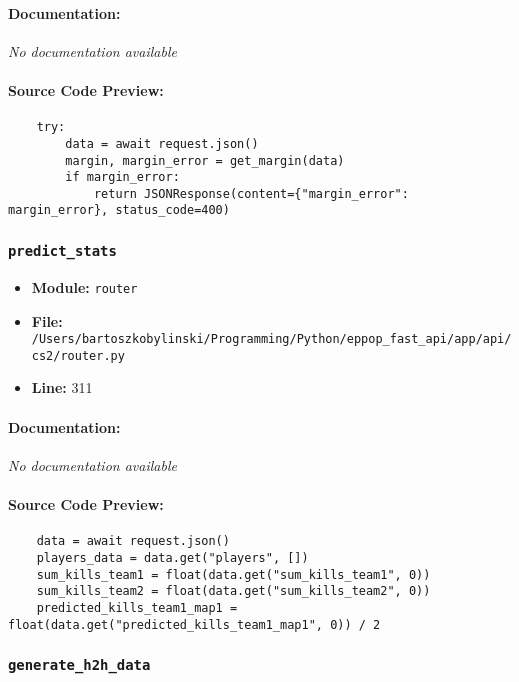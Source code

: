 \documentclass[11pt,a4paper]{article}
\begin{document}
\paragraph{Documentation:} \textit{No documentation available}

\paragraph{Source Code Preview:}
\begin{verbatim}
    try:
        data = await request.json()
        margin, margin_error = get_margin(data)
        if margin_error:
            return JSONResponse(content={"margin_error": margin_error}, status_code=400)
\end{verbatim}

\vspace{1em}
\subsubsection{\texttt{predict\_stats}}

\begin{itemize}
    \item \textbf{Module:} \texttt{router}
    \item \textbf{File:} \texttt{/Users/bartoszkobylinski/Programming/Python/eppop\_fast\_api/app/api/cs2/router.py}
    \item \textbf{Line:} 311
\end{itemize}

\paragraph{Documentation:} \textit{No documentation available}

\paragraph{Source Code Preview:}
\begin{verbatim}
    data = await request.json()
    players_data = data.get("players", [])
    sum_kills_team1 = float(data.get("sum_kills_team1", 0))
    sum_kills_team2 = float(data.get("sum_kills_team2", 0))
    predicted_kills_team1_map1 = float(data.get("predicted_kills_team1_map1", 0)) / 2
\end{verbatim}

\vspace{1em}
\subsubsection{\texttt{generate\_h2h\_data}}
\end{document}
